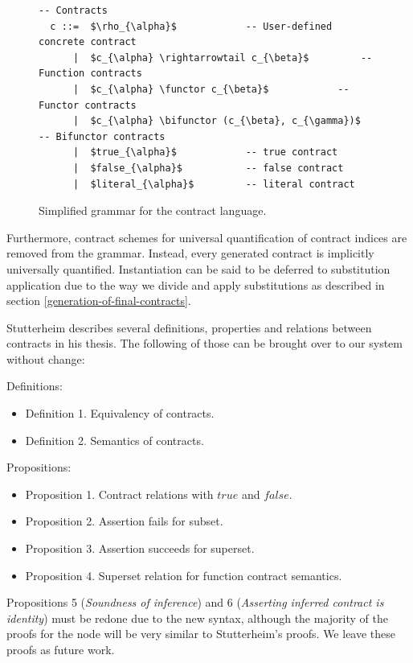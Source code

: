 \documentclass[10pt]{report}
\makeatletter
\newcommand{\functor}{<\!\!\!@\!\!\!>}
\newcommand{\bifunctor}{<\!\!\!@\!\!@\!\!\!>}
\newcommand{\code}[1]{%
  {%
   \setlength{\fboxsep}{-2\fboxrule}%
   \fcolorbox{black}{light-gray}{\hspace{1.5pt}\strut\texttt{#1}\hspace{1.5pt}}%
  }%
}
\makeatother
\begin{document}
\begin{figure}[htbp]
\begin{center}
\begin{lstlisting}[mathescape]
  -- Contracts
  c ::=  $\rho_{\alpha}$			-- User-defined concrete contract
      |  $c_{\alpha} \rightarrowtail c_{\beta}$			-- Function contracts
      |  $c_{\alpha} \functor c_{\beta}$			-- Functor contracts
      |  $c_{\alpha} \bifunctor (c_{\beta}, c_{\gamma})$			-- Bifunctor contracts
      |  $true_{\alpha}$			-- true contract
      |  $false_{\alpha}$			-- false contract
      |  $literal_{\alpha}$			-- literal contract
\end{lstlisting}
\end{center}
\caption{\label{fig:contract-grammar}Simplified grammar for the contract language.}
\end{figure}

Furthermore, contract schemes for universal quantification of contract indices are removed from the grammar.
Instead, every generated contract is implicitly universally quantified.
Instantiation can be said to be deferred to substitution application due to the way we divide and apply substitutions as described in section \ref{generation-of-final-contracts}.

Stutterheim describes several definitions, properties and relations between contracts in his thesis. 
The following of those can be brought over to our system without change:

Definitions:
\begin{itemize}
	\item Definition 1. Equivalency of contracts.
	\item Definition 2. Semantics of contracts.
\end{itemize}

Propositions:
\begin{itemize}
	\item Proposition 1. Contract relations with $true$ and $false$.
	\item Proposition 2. Assertion fails for subset.
	\item Proposition 3. Assertion succeeds for superset.
	\item Proposition 4. Superset relation for function contract semantics.
\end{itemize}

Propositions 5 (\textit{Soundness of inference}) and 6 (\textit{Asserting inferred contract is identity}) must be redone due to the new syntax, although the majority of the proofs for the \code{Expr} node will be very similar to Stutterheim's proofs.
We leave these proofs as future work.
\end{document}
